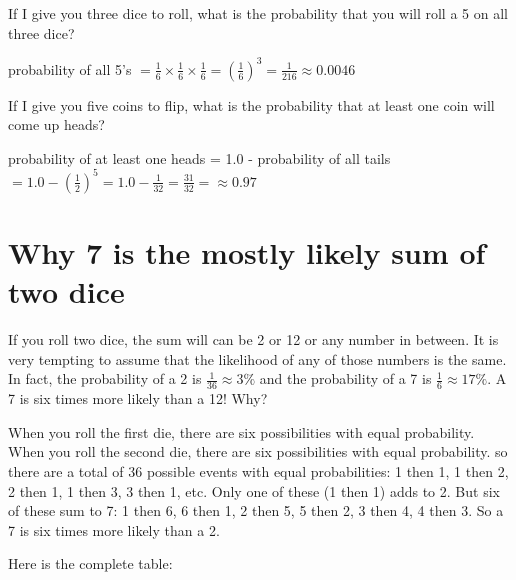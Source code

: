 \begin{Exercise}[title={Rolling Dice}, label=rolling-dice]
  If I give you three dice to roll, what is the
  probability that you will roll a 5 on all three dice?
\end{Exercise}
\begin{Answer}[ref=rolling-dice]
  probability of all 5's $ = \frac{1}{6}\times\frac{1}{6}\times\frac{1}{6} = \left(\frac{1}{6}\right)^3 = \frac{1}{216} \approx 0.0046$
  \end{Answer}
    
\begin{Exercise}[title={Flipping Coins}, label=flipping-coins]
  If I give you five coins to flip, what is the
  probability that at least one coin will come up heads?
\end{Exercise}
\begin{Answer}[ref=rolling-dice]
  probability of at least one heads = 1.0 - probability of all tails $ = 1.0 - \left(\frac{1}{2}\right)^5 =1.0 - \frac{1}{32} = \frac{31}{32} = \approx 0.97$ 
  \end{Answer}
    
\section{Why 7 is the mostly likely sum of two dice}

If you roll two dice, the sum will can be 2 or 12 or any number in
between. It is very tempting to assume that the likelihood of any of
those numbers is the same. In fact, the probability of a 2 is
$\frac{1}{36} \approx 3\%$ and the probability of a 7 is $\frac{1}{6}
\approx 17\%$. A 7 is six times more likely than a 12! Why?

When you roll the first die, there are six possibilities with equal
probability. When you roll the second die, there are six possibilities
with equal probability. so there are a total of 36 possible events
with equal probabilities: 1 then 1, 1 then 2, 2 then 1, 1 then 3, 3
then 1, etc. Only one of these (1 then 1) adds to 2.  But six of these
sum to 7: 1 then 6, 6 then 1, 2 then 5, 5 then 2, 3 then 4, 4 then
3. So a 7 is six times more likely than a 2.

Here is the complete table:

